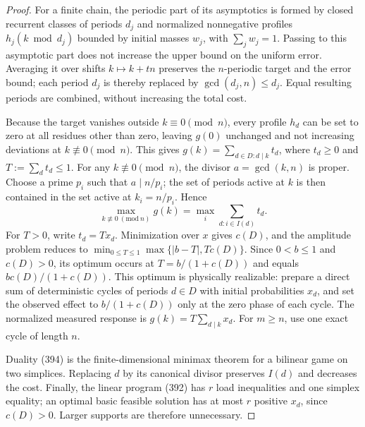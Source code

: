\documentclass[11pt,a4paper,oneside]{book}
\begin{document}
\begin{proof}
For a finite chain, the periodic part of its asymptotics is formed by closed recurrent classes of periods $d_j$ and normalized nonnegative profiles $h_j(k\bmod d_j)$ bounded by initial masses $w_j$, with $\sum_jw_j=1$. Passing to this asymptotic part does not increase the upper bound on the uniform error. Averaging it over shifts $k\mapsto k+tn$ preserves the $n$-periodic target and the error bound; each period $d_j$ is thereby replaced by $\gcd(d_j,n)\le d_j$. Equal resulting periods are combined, without increasing the total cost.

Because the target vanishes outside $k\equiv0\pmod n$, every profile $h_d$ can be set to zero at all residues other than zero, leaving $g(0)$ unchanged and not increasing deviations at $k\not\equiv0\pmod n$. This gives $g(k)=\sum_{d\in D:d\mid k}t_d$, where $t_d\ge0$ and $T:=\sum_dt_d\le1$. For any $k\not\equiv0\pmod n$, the divisor $a=\gcd(k,n)$ is proper. Choose a prime $p_i$ such that $a\mid n/p_i$; the set of periods active at $k$ is then contained in the set active at $k_i=n/p_i$. Hence
\[
\max_{k\not\equiv0\ (\mathrm{mod}\ n)}g(k)=\max_i\sum_{d:i\in I(d)}t_d.
\]
For $T>0$, write $t_d=Tx_d$. Minimization over $x$ gives $c(D)$, and the amplitude problem reduces to $\min_{0\le T\le1}\max\{|b-T|,Tc(D)\}$. Since $0<b\le1$ and $c(D)>0$, its optimum occurs at $T=b/(1+c(D))$ and equals $bc(D)/(1+c(D))$. This optimum is physically realizable: prepare a direct sum of deterministic cycles of periods $d\in D$ with initial probabilities $x_d$, and set the observed effect to $b/(1+c(D))$ only at the zero phase of each cycle. The normalized measured response is $g(k)=T\sum_{d\mid k}x_d$. For $m\ge n$, use one exact cycle of length $n$.

Duality (394) is the finite-dimensional minimax theorem for a bilinear game on two simplices. Replacing $d$ by its canonical divisor preserves $I(d)$ and decreases the cost. Finally, the linear program (392) has $r$ load inequalities and one simplex equality; an optimal basic feasible solution has at most $r$ positive $x_d$, since $c(D)>0$. Larger supports are therefore unnecessary.
\end{proof}
\end{document}
